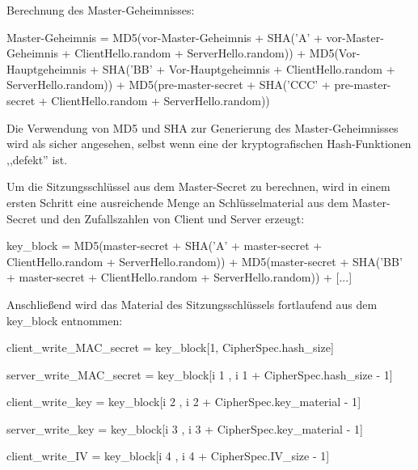 \documentclass[a4paper]{article}
\begin{document}
\begin{multicols}{3}
\begin{itemize*}
\begin{itemize*}
                  \item       Berechnung des Master-Geheimnisses:
                  \begin{itemize*}
                        \item Master-Geheimnis = MD5(vor-Master-Geheimnis + SHA('A' + vor-Master-Geheimnis + ClientHello.random + ServerHello.random)) + MD5(Vor-Hauptgeheimnis + SHA('BB' + Vor-Hauptgeheimnis + ClientHello.random + ServerHello.random)) + MD5(pre-master-secret + SHA('CCC' + pre-master-secret + ClientHello.random + ServerHello.random))
                  \end{itemize*}
                  \item       Die Verwendung von MD5 und SHA zur Generierung des Master-Geheimnisses
                  wird als sicher angesehen, selbst wenn eine der kryptografischen
                  Hash-Funktionen ,,defekt'' ist.
                  \item       Um die Sitzungsschlüssel aus dem Master-Secret zu berechnen, wird in
                  einem ersten Schritt eine ausreichende Menge an Schlüsselmaterial aus
                  dem Master-Secret und den Zufallszahlen von Client und Server erzeugt:
                  \begin{itemize*}
                        \item key\_block = MD5(master-secret + SHA('A' + master-secret + ClientHello.random + ServerHello.random)) + MD5(master-secret + SHA('BB' + master-secret + ClientHello.random + ServerHello.random)) + {[}...{]}
                  \end{itemize*}
                  \item       Anschließend wird das Material des Sitzungsschlüssels fortlaufend aus
                  dem key\_block entnommen:
                  \begin{itemize*}
                        \item client\_write\_MAC\_secret = key\_block{[}1, CipherSpec.hash\_size{]}
                        \item server\_write\_MAC\_secret = key\_block{[}i 1 , i 1 + CipherSpec.hash\_size - 1{]}
                        \item client\_write\_key = key\_block{[}i 2 , i 2 + CipherSpec.key\_material - 1{]}
                        \item server\_write\_key = key\_block{[}i 3 , i 3 + CipherSpec.key\_material - 1{]}
                        \item client\_write\_IV = key\_block{[}i 4 , i 4 + CipherSpec.IV\_size - 1{]}

\end{itemize*}
\end{itemize*}
\end{itemize*}
\end{multicols}
\end{document}
